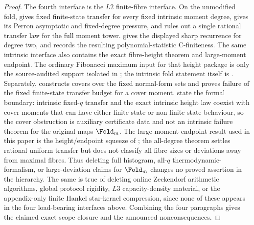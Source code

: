 \begin{proof}
The fourth interface is the \(L2\) finite-fibre interface.  On the unmodified
fold,  gives fixed finite-state transfer
for every fixed intrinsic moment degree,
 gives its Perron asymptotic and
fixed-degree pressure, and
 rules out a single rational
transfer law for the full moment tower.
 gives the displayed sharp recurrence
for degree two, and  records the
resulting polynomial-statistic C-finiteness.  The same intrinsic interface also
contains the exact fibre-height theorem and large-moment endpoint.  The ordinary
Fibonacci maximum input for that height package is only the source-audited
support isolated in
; the intrinsic fold statement itself is
.
Separately,  constructs covers over the fixed
normal-form sets and proves failure of the fixed finite-state transfer budget for
a cover moment.  
state the formal boundary: intrinsic fixed-\(q\) transfer and the exact intrinsic
height law coexist with cover moments that can have either finite-state or
non-finite-state behaviour, so the cover obstruction is auxiliary certificate data
and not an intrinsic failure theorem for the original maps \(\Fold_m\).  The
large-moment endpoint result used in this paper is the height/endpoint squeeze of
;
the all-degree theorem settles rational uniform transfer but does not classify
all fibre sizes or deviations away from maximal fibres.  Thus
deleting full histogram, all-\(q\) thermodynamic-formalism, or large-deviation
claims for \(\Fold_m\) changes no proved assertion in the hierarchy.  The same is
true of deleting online Zeckendorf arithmetic algorithms, global protocol
rigidity, \(L3\) capacity-density material, or the appendix-only finite Hankel
star-kernel compression, since none of these appears in the four load-bearing
interfaces above.  Combining the four paragraphs gives the claimed exact scope
closure and the announced nonconsequences.
\end{proof}

